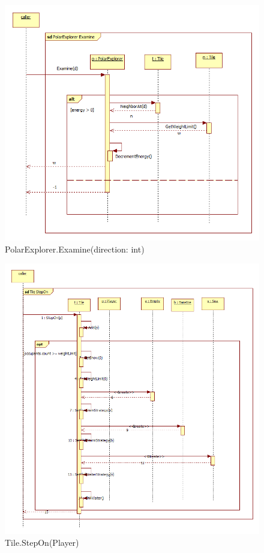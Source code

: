 \begin{figure}[H]
	\begin{center}
		\includegraphics[width=15cm]{chapters/chapter04/seqdiag/PolarExplorer_Examine.png}
		\caption{PolarExplorer.Examine(direction: int)}
		\label{fig:PolarExplorerExamine}
	\end{center}
\end{figure}
\begin{figure}[H]
	\begin{center}
		\includegraphics[width=15cm]{chapters/chapter04/seqdiag/Tile_StepOn.png}
		\caption{Tile.StepOn(Player)}
		\label{fig:TileStepOn}
	\end{center}
\end{figure}
